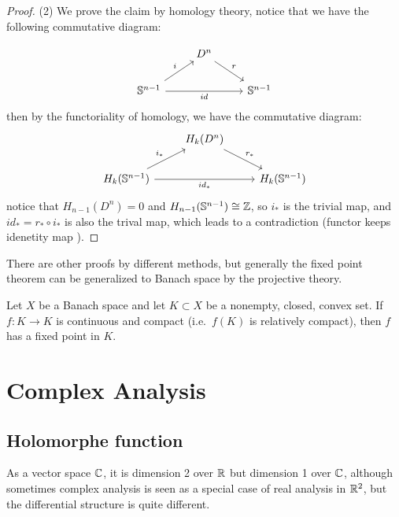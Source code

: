\begin{proof}
    (2) We prove the claim by homology theory, notice that we have the following commutative diagram:
    
\[\begin{tikzcd}
	& {D^n} \\
	{\mathbb{S}^{n-1}} && {\mathbb{S}^{n-1}}
	\arrow["r", from=1-2, to=2-3]
	\arrow["i", from=2-1, to=1-2]
	\arrow["id"', from=2-1, to=2-3]
\end{tikzcd}\]
    then by the functoriality of homology, we have the commutative diagram:
\[\begin{tikzcd}
	& {H_k(D^n)} \\
	{H_k(\mathbb{S}^{n-1})} && {H_k(\mathbb{S}^{n-1})}
	\arrow["{r_*}", from=1-2, to=2-3]
	\arrow["{i_*}", from=2-1, to=1-2]
	\arrow["{id_*}"', from=2-1, to=2-3]
\end{tikzcd}\]
    notice that \(H_{n-1}(D^n) = 0\) and \(H_{n-1}(\mathbb{S}^{n-1}) \cong \mathbb{Z}\), so \(i_*\) is the trivial map, and \(id_* = r_* \circ i_*\) is also the trival map, which leads to a contradiction (functor keeps idenetity map ).




\end{proof}

There are other proofs by different methods, but generally the fixed point theorem can be generalized to Banach space by the projective theory.

\begin{theorem}[Schauder]
    Let $X$ be a Banach space and let $K \subset X$ be a nonempty, closed, convex set.
If $f : K \to K$ is continuous and compact (i.e.\ $f(K)$ is relatively compact),
then $f$ has a fixed point in $K$.
\end{theorem}

\newpage
\section{Complex Analysis}
\subsection{Holomorphe function}

As a vector space \(\mathbb{C}\), it is dimension 2 over \(\mathbb{R}\) but dimension 1 over \(\mathbb{C}\), although sometimes complex analysis is seen as a special case of real analysis in \(\mathbb{R}^2\), but the differential structure is quite different.

